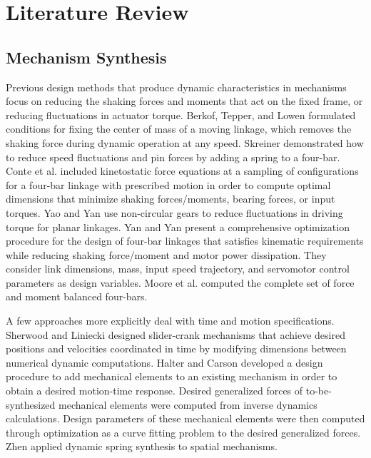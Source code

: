 \documentclass[journal]{IEEEtran}
\begin{document}
\section{Literature Review}
\label{sec:lit_rev}

\subsection{Mechanism Synthesis}
\label{sec:mech_synth}

Previous design methods that produce dynamic characteristics in mechanisms focus on reducing the shaking forces and moments that act on the fixed frame, or reducing fluctuations in actuator torque.
Berkof, Tepper, and Lowen \cite{berkofNewMethodCompletely1969,tepperGeneralTheoremsConcerning1972,lowenBalancingLinkagesUpdate1983} formulated conditions for fixing the center of mass of a moving linkage, which removes the shaking force during dynamic operation at any speed.
Skreiner \cite{skreinerDynamicAnalysisUsed1970} demonstrated how to reduce speed fluctuations and pin forces by adding a spring to a four-bar.
Conte et al. \cite{conteOptimumMechanismDesign1975} included kinetostatic force equations at a sampling of configurations for a four-bar linkage with prescribed motion in order to compute optimal dimensions that minimize shaking forces/moments, bearing forces, or input torques.
Yao and Yan \cite{yaoNewMethodTorque2003} use non-circular gears to reduce fluctuations in driving torque for planar linkages.
Yan and Yan \cite{yanIntegratedControlMechanism2009} present a comprehensive optimization procedure for the design of four-bar linkages that satisfies kinematic requirements while reducing shaking force/moment and motor power dissipation.  They consider link dimensions, mass, input speed trajectory, and servomotor control parameters as design variables.
Moore et al. \cite{mooreDeterminationCompleteSet2009} computed the complete set of force and moment balanced four-bars.


A few approaches more explicitly deal with time and motion specifications.  
Sherwood \cite{sherwoodDynamicSynthesisMechanism1968} and Liniecki \cite{linieckiSynthesisSlidercrankMechanism1970} designed slider-crank mechanisms that achieve desired positions and velocities coordinated in time by modifying dimensions between numerical dynamic computations.
Halter and Carson \cite{halterMechanismForceSystemSynthesis1975} developed a design procedure to add mechanical elements to an existing mechanism in order to obtain a desired motion-time response.  Desired generalized forces of to-be-synthesized mechanical elements were computed from inverse dynamics calculations.  Design parameters of these mechanical elements were then computed through optimization as a curve fitting problem to the desired generalized forces.  Zhen \cite{zhenAnalyticalSynthesisSpring1988} applied dynamic spring synthesis to spatial mechanisms.
\end{document}
